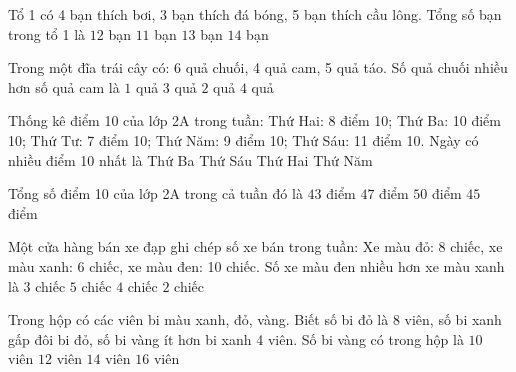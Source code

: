 \begin{ex} %
Tổ 1 có 4 bạn thích bơi, 3 bạn thích đá bóng, 5 bạn thích cầu lông. Tổng số bạn trong tổ 1 là
\choice
{\True $12$ bạn}
{$11$ bạn}
{$13$ bạn}
{$14$ bạn}
\end{ex}

\begin{ex} %
Trong một đĩa trái cây có: 6 quả chuối, 4 quả cam, 5 quả táo. Số quả chuối nhiều hơn số quả cam là
\choice
{$1$ quả}
{$3$ quả}
{\True $2$ quả}
{$4$ quả}
\end{ex}

\begin{ex} %
Thống kê điểm 10 của lớp 2A trong tuần: Thứ Hai: 8 điểm 10; Thứ Ba: 10 điểm 10; Thứ Tư: 7 điểm 10; Thứ Năm: 9 điểm 10; Thứ Sáu: 11 điểm 10. Ngày có nhiều điểm 10 nhất là
\choice
{Thứ Ba}
{\True Thứ Sáu}
{Thứ Hai}
{Thứ Năm}
\end{ex}

\begin{ex} %
Tổng số điểm 10 của lớp 2A trong cả tuần đó là
\choice
{$43$ điểm}
{$47$ điểm}
{$50$ điểm}
{\True $45$ điểm}
\end{ex}

\begin{ex} %
Một cửa hàng bán xe đạp ghi chép số xe bán trong tuần: Xe màu đỏ: 8 chiếc, xe màu xanh: 6 chiếc, xe màu đen: 10 chiếc. Số xe màu đen nhiều hơn xe màu xanh là
\choice
{$3$ chiếc}
{$5$ chiếc}
{\True $4$ chiếc}
{$2$ chiếc}
\end{ex}

\begin{ex} %
Trong hộp có các viên bi màu xanh, đỏ, vàng. Biết số bi đỏ là 8 viên, số bi xanh gấp đôi bi đỏ, số bi vàng ít hơn bi xanh 4 viên. Số bi vàng có trong hộp là
\choice
{$10$ viên}
{\True $12$ viên}
{$14$ viên}
{$16$ viên}
\end{ex}

